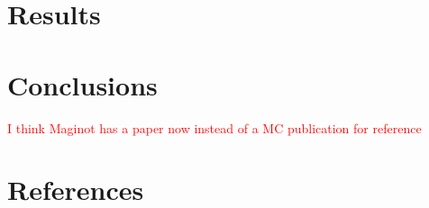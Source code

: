 \documentclass{elsarticle}
\newcommand{\tcr}[1]{\textcolor{red}{#1}}
\begin{document}
\section{Results\label{sec:results}}


\section{Conclusions\label{sec:conclusions}}


\tcr{I think Maginot has a paper now instead of a MC publication for reference}
\section*{References}


\end{document}
